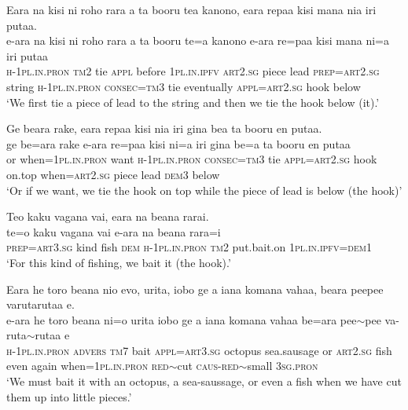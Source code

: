 \ea\label{ex:text26-5}
Eara na kisi ni roho rara a ta booru tea kanono, eara repaa kisi mana nia iri putaa.\\
\gll e-ara	na	kisi	ni	roho	rara	a	ta	booru	te=a	kanono	e-ara	re=paa	kisi	mana	ni=a	iri	putaa\\
     \textsc{h}-1\textsc{pl}.\textsc{in}.\textsc{pron}	\textsc{tm}2	tie	\textsc{appl}	before	1\textsc{pl}.\textsc{in}.\textsc{ipfv}	\textsc{art}2.\textsc{sg}	piece	lead	\textsc{prep}=\textsc{art}2.\textsc{sg}	string	\textsc{h}-1\textsc{pl}.\textsc{in}.\textsc{pron}	\textsc{consec}=\textsc{tm}3	tie	eventually	\textsc{appl}=\textsc{art}2.\textsc{sg}	hook	below\\
\glt `We first tie a piece of lead to the string and then we tie the hook below (it).'
\z

\ea\label{ex:text26-6}
Ge beara rake, eara repaa kisi nia iri gina bea ta booru en putaa.\\
\gll ge	be=ara	rake	e-ara	re=paa	kisi	ni=a	iri	gina	be=a	ta	booru	en	putaa\\
     or	when=1\textsc{pl}.\textsc{in}.\textsc{pron}	want	\textsc{h}-1\textsc{pl}.\textsc{in}.\textsc{pron}	\textsc{consec}=\textsc{tm}3	tie	\textsc{appl}=\textsc{art}2.\textsc{sg}	hook	on.top	when=\textsc{art}2.\textsc{sg}	piece	lead	\textsc{dem}3	below\\
\glt `Or if we want, we tie the hook on top while the piece of lead is below (the hook)'
\z

\ea\label{ex:text26-7}
Teo kaku vagana vai, eara na beana rarai.\\
\gll te=o	kaku	vagana	vai	e-ara	na	beana	rara=i\\
     \textsc{prep}=\textsc{art}3.\textsc{sg}	kind	fish	\textsc{dem}	\textsc{h}-1\textsc{pl}.\textsc{in}.\textsc{pron}	\textsc{tm}2	put.bait.on	1\textsc{pl}.\textsc{in}.\textsc{ipfv}=\textsc{dem}1\\
\glt `For this kind of fishing, we bait it (the hook).'
\z

\ea\label{ex:text26-8}
Eara he toro beana nio evo, urita, iobo ge a iana komana vahaa, beara peepee varutarutaa e.\\
\gll e-ara	he	toro	beana	ni=o	urita	iobo	ge	a	iana	komana	vahaa	be=ara	pee{$\sim$}pee	va-ruta{$\sim$}rutaa	e\\
     \textsc{h}-1\textsc{pl}.\textsc{in}.\textsc{pron}	\textsc{advers}	\textsc{tm}7	bait	\textsc{appl}=\textsc{art}3.\textsc{sg}	octopus	sea.sausage	or	\textsc{art}2.\textsc{sg}	fish	even	again	when=1\textsc{pl}.\textsc{in}.\textsc{pron}	\textsc{red}{$\sim$}cut	\textsc{caus}-\textsc{red}{$\sim$}small	3\textsc{sg}.\textsc{pron}\\
\glt `We must bait it with an octopus, a sea-saussage, or even a fish when we have cut them up into little pieces.'
\z

